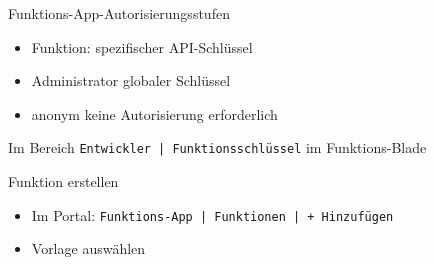 \begin{flashcard}[Definition]{Funktions-App-Autorisierungsstufen}
    \begin{itemize}
        \item Funktion:\newline
            spezifischer API-Schlüssel
        \item Administrator\newline
            globaler Schlüssel
        \item anonym\newline
            keine Autorisierung erforderlich
    \end{itemize}
    Im Bereich \texttt{Entwickler | Funktionsschlüssel} im Funktions-Blade
\end{flashcard}

\begin{flashcard}[Definition]{Funktion erstellen}
    \begin{itemize}
        \item Im Portal:\newline
            \texttt{Funktions-App | Funktionen | + Hinzufügen}
        \item Vorlage auswählen
    \end{itemize}
\end{flashcard}


